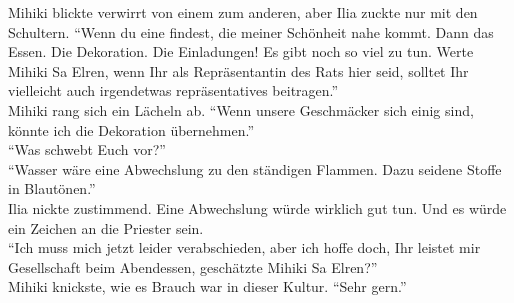 Mihiki blickte verwirrt von einem zum anderen, aber Ilia zuckte nur mit den Schultern. ``Wenn du 
eine findest, die meiner Schönheit nahe kommt. Dann das Essen. Die Dekoration. Die Einladungen! Es 
gibt noch so viel zu tun. Werte Mihiki Sa Elren, wenn Ihr als Repräsentantin des Rats hier 
seid, solltet Ihr vielleicht auch irgendetwas repräsentatives beitragen.''\\
Mihiki rang sich ein Lächeln ab. ``Wenn unsere Geschmäcker sich einig sind, könnte ich die 
Dekoration übernehmen.''\\
``Was schwebt Euch vor?''\\
``Wasser wäre eine Abwechslung zu den ständigen Flammen. Dazu seidene Stoffe in Blautönen.''\\
Ilia nickte zustimmend. Eine Abwechslung würde wirklich gut tun. Und es würde ein Zeichen an die 
Priester sein.\\
``Ich muss mich jetzt leider verabschieden, aber ich hoffe doch, Ihr leistet mir Gesellschaft beim 
Abendessen, geschätzte Mihiki Sa Elren?''\\
Mihiki knickste, wie es Brauch war in dieser Kultur. ``Sehr gern.''\\


